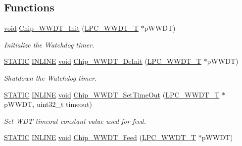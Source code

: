 \subsection*{Functions}
\begin{DoxyCompactItemize}
\item 
\hyperlink{Paradigm_2Tern__EE_2small_2portmacro_8h_a14d32f8130d3c0b212cfc751730b5b49}{void} \hyperlink{group__WWDT__17XX__40XX_gab4cdf632b42394855a6b8cf969f49693}{Chip\-\_\-\-W\-W\-D\-T\-\_\-\-Init} (\hyperlink{structLPC__WWDT__T}{L\-P\-C\-\_\-\-W\-W\-D\-T\-\_\-\-T} $\ast$p\-W\-W\-D\-T)
\begin{DoxyCompactList}\small\item\em Initialize the Watchdog timer. \end{DoxyCompactList}\item 
\hyperlink{group__LPC__Types__Public__Macros_ga10b2d890d871e1489bb02b7e70d9bdfb}{S\-T\-A\-T\-I\-C} \hyperlink{group__LPC__Types__Public__Types_ga2eb6f9e0395b47b8d5e3eeae4fe0c116}{I\-N\-L\-I\-N\-E} \hyperlink{Paradigm_2Tern__EE_2small_2portmacro_8h_a14d32f8130d3c0b212cfc751730b5b49}{void} \hyperlink{group__WWDT__17XX__40XX_gaac3365ace1492b5ccc89472fb3f2cfc0}{Chip\-\_\-\-W\-W\-D\-T\-\_\-\-De\-Init} (\hyperlink{structLPC__WWDT__T}{L\-P\-C\-\_\-\-W\-W\-D\-T\-\_\-\-T} $\ast$p\-W\-W\-D\-T)
\begin{DoxyCompactList}\small\item\em Shutdown the Watchdog timer. \end{DoxyCompactList}\item 
\hyperlink{group__LPC__Types__Public__Macros_ga10b2d890d871e1489bb02b7e70d9bdfb}{S\-T\-A\-T\-I\-C} \hyperlink{group__LPC__Types__Public__Types_ga2eb6f9e0395b47b8d5e3eeae4fe0c116}{I\-N\-L\-I\-N\-E} \hyperlink{Paradigm_2Tern__EE_2small_2portmacro_8h_a14d32f8130d3c0b212cfc751730b5b49}{void} \hyperlink{group__WWDT__17XX__40XX_ga3147a15042f4276588c83e98b0a1b996}{Chip\-\_\-\-W\-W\-D\-T\-\_\-\-Set\-Time\-Out} (\hyperlink{structLPC__WWDT__T}{L\-P\-C\-\_\-\-W\-W\-D\-T\-\_\-\-T} $\ast$p\-W\-W\-D\-T, uint32\-\_\-t timeout)
\begin{DoxyCompactList}\small\item\em Set W\-D\-T timeout constant value used for feed. \end{DoxyCompactList}\item 
\hyperlink{group__LPC__Types__Public__Macros_ga10b2d890d871e1489bb02b7e70d9bdfb}{S\-T\-A\-T\-I\-C} \hyperlink{group__LPC__Types__Public__Types_ga2eb6f9e0395b47b8d5e3eeae4fe0c116}{I\-N\-L\-I\-N\-E} \hyperlink{Paradigm_2Tern__EE_2small_2portmacro_8h_a14d32f8130d3c0b212cfc751730b5b49}{void} \hyperlink{group__WWDT__17XX__40XX_ga88db6aef307efd5cbc629695c4678006}{Chip\-\_\-\-W\-W\-D\-T\-\_\-\-Feed} (\hyperlink{structLPC__WWDT__T}{L\-P\-C\-\_\-\-W\-W\-D\-T\-\_\-\-T} $\ast$p\-W\-W\-D\-T)

\end{DoxyCompactItemize}
